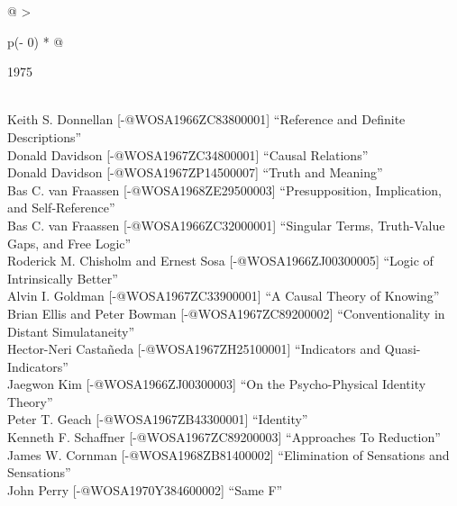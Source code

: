 \documentclass[
  10pt,
  letterpaper,
  DIV=11,
  numbers=noendperiod,
  twoside]{scrartcl}
\begin{document}
\begin{longtable}[]{@{}
  >{\raggedright\arraybackslash}p{(\columnwidth - 0\tabcolsep) * }@{}}

\caption{\label{tbl-top-ten-1966}Most cited articles published less than
ten years ago as of 1975.}

\tabularnewline

\toprule\noalign{}
\begin{minipage}[b]{\linewidth}\raggedright
1975
\end{minipage} \\
\midrule\noalign{}
\endhead
\bottomrule\noalign{}
\endlastfoot
Keith S. Donnellan {[}-@WOSA1966ZC83800001{]} ``Reference and Definite
Descriptions'' \\
Donald Davidson {[}-@WOSA1967ZC34800001{]} ``Causal Relations'' \\
Donald Davidson {[}-@WOSA1967ZP14500007{]} ``Truth and Meaning'' \\
Bas C. van Fraassen {[}-@WOSA1968ZE29500003{]} ``Presupposition,
Implication, and Self-Reference'' \\
Bas C. van Fraassen {[}-@WOSA1966ZC32000001{]} ``Singular Terms,
Truth-Value Gaps, and Free Logic'' \\
Roderick M. Chisholm and Ernest Sosa {[}-@WOSA1966ZJ00300005{]} ``Logic
of Intrinsically Better'' \\
Alvin I. Goldman {[}-@WOSA1967ZC33900001{]} ``A Causal Theory of
Knowing'' \\
Brian Ellis and Peter Bowman {[}-@WOSA1967ZC89200002{]}
``Conventionality in Distant Simulataneity'' \\
Hector-Neri Castañeda {[}-@WOSA1967ZH25100001{]} ``Indicators and
Quasi-Indicators'' \\
Jaegwon Kim {[}-@WOSA1966ZJ00300003{]} ``On the Psycho-Physical Identity
Theory'' \\
Peter T. Geach {[}-@WOSA1967ZB43300001{]} ``Identity'' \\
Kenneth F. Schaffner {[}-@WOSA1967ZC89200003{]} ``Approaches To
Reduction'' \\
James W. Cornman {[}-@WOSA1968ZB81400002{]} ``Elimination of Sensations
and Sensations'' \\
John Perry {[}-@WOSA1970Y384600002{]} ``Same F'' \\

\end{longtable}
\end{document}
